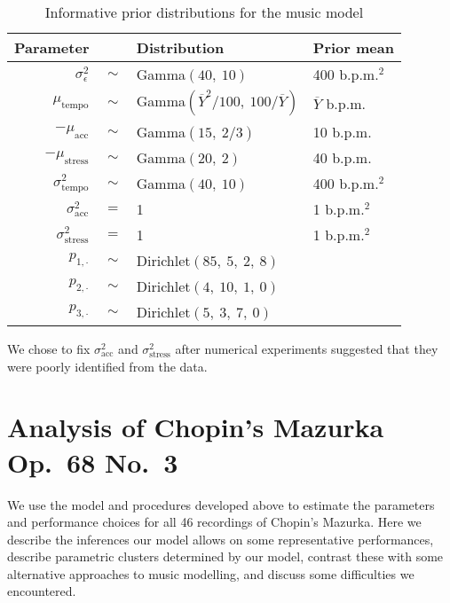 \documentclass[12pt]{article}
\begin{document}
\begin{table}[t]
  \centering
  \begin{tabular}{@{}rcll@{}}
    \toprule
    Parameter & \phantom{a} & Distribution & Prior mean\\
    \midrule
    $\sigma^2_{\epsilon}$ & $\sim$ & Gamma$(40,\ 10)$ & 400 b.p.m.$^2$\\
    $\mu_{\textrm{tempo}}$ & $\sim$ & Gamma$(\overline{Y}^2/100,\ 100
                                      /\overline{Y})$ & $\overline{Y}$
                                                        b.p.m.\\
    $-\mu_{\textrm{acc}} $ & $\sim$ & Gamma$(15,\ 2/3)$ & 10 b.p.m.\\
    $-\mu_{\textrm{stress}} $ & $\sim$ & Gamma$(20,\ 2)$ & 40 b.p.m.\\
    $\sigma^2_{\textrm{tempo}} $ & $\sim$ & Gamma$(40,\ 10)$ & 400
                                                               b.p.m.$^2$\\
    $\sigma^2_{\textrm{acc}} $ & $=$ & 1 & 1 b.p.m.$^2$\\
    $\sigma^2_{\textrm{stress}} $ & $=$ & 1 & 1 b.p.m.$^2$\\
    $p_{1,\cdot}$ & $\sim$ & Dirichlet$(85,\ 5,\ 2,\ 8)$ \\
    $p_{2,\cdot}$ & $\sim$ & Dirichlet$(4,\ 10,\ 1,\ 0)$ \\
    $p_{3,\cdot}$ & $\sim$ & Dirichlet$(5,\ 3,\ 7,\ 0)$ \\
    \bottomrule
  \end{tabular}
  \caption{Informative prior distributions for the music model}
  \label{tab:priors}
\end{table}
We chose to fix $\sigma^2_{\textrm{acc}}$ and
$\sigma^2_{\textrm{stress}}$ after numerical experiments suggested
that they were poorly identified from the data.


\section{Analysis of Chopin's Mazurka Op.\ 68 No.\ 3}
\label{sec:analys-chop-mazurka}

We use the model and procedures developed above to estimate the
parameters and performance choices for all 46 recordings of Chopin's
Mazurka. Here we describe the inferences our model allows on some
representative performances, describe parametric clusters determined
by our model, contrast these with some alternative approaches to music
modelling, and discuss some difficulties we encountered.
\end{document}

